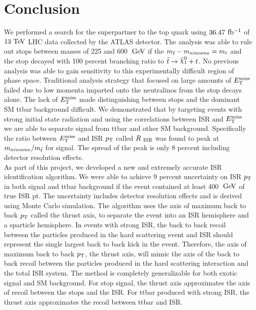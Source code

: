 \chapter{Conclusion}
\label{conclusion}

\indent We performed a search for the superpartner to the top quark using $36.47$ $\mbox{fb$^{-1}$}$ of $13 \tev$ LHC data collected by the ATLAS detector.   The analysis was able to rule out stops between masses of 225 and 600 $\gev$ if the $m_{\tilde{t}} - m_{ninoone} = m_{t}$ and the stop decayed with 100 percent branching ratio to $\stop \rightarrow \ninoone + t$.   No previous analysis was able to gain sensitivity to this experimentally difficult region of phase space.  Traditional analysis strategy that focused on large amounts of $E_{\mathrm{T}}^{\mathrm{miss}}$ failed due to low momenta imparted onto the neutralinos from the stop decays alone.  The lack of $E_{\mathrm{T}}^{\mathrm{miss}}$ made distinguishing between stops and the dominant SM ttbar background difficult.  We demonstrated that by targeting events with strong initial state radiation and using the correlations between ISR and $E_{\mathrm{T}}^{\mathrm{miss}}$ we are able to separate signal from ttbar and other SM background.  Specifically the ratio between $E_{\mathrm{T}}^{\mathrm{miss}}$ and ISR $p_{\mathrm{T}}$ called $R_{~\mathrm{ISR}}$ was found to peak at $m_{ninoone}/m_{\tilde{t}}$ for signal.  The spread of the peak is only 8 percent including detector resolution effects.  \\

\indent As part of this project, we developed a new and extremely accurate ISR identification algorithm.  We were able to achieve 9 percent uncertainty on ISR $p_{\mathrm{T}}$ in both signal and ttbar background if the event contained at least 400 $\gev$ of true ISR pt.  The uncertainty includes detector resolution effects and is derived using Monte Carlo simulation.  The algorithm uses the axis of maximum back to back $p_{\mathrm{T}}$ called the thrust axis, to separate the event into an ISR hemisphere and a sparticle hemisphere.  In events with strong ISR, the back to back recoil between the particles produced in the hard scattering event and ISR should represent the single largest back to back kick in the event.  Therefore, the axis of maximum back to back $p_{\mathrm{T}}$, the thrust axis, will mimic the axis of the back to back recoil between the particles produced in the hard scattering interaction and the total ISR system.  The method is completely generalizable for both exotic signal and SM background.  For stop signal, the thrust axis approximates the axis of recoil between the stops and the ISR.  For ttbar produced with strong ISR, the thrust axis approximates the recoil between ttbar and ISR.  \\

